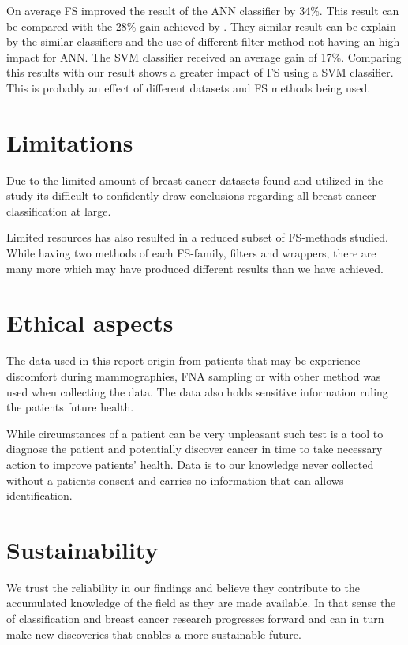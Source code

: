 On average FS improved the result of the ANN classifier by 34\%. This result can be compared with the 28\% gain achieved by \textcite{karabulut2012}. They similar result can be explain by the similar classifiers and the use of different filter method not having an high impact for ANN. The SVM classifier received an average gain of 17\%. Comparing this results with \textcite{b20103177} our result shows a greater impact of FS using a SVM classifier. This is probably an effect of different datasets and FS methods being used.

\section{Limitations}

Due to the limited amount of breast cancer datasets found and utilized in the study its difficult to confidently draw conclusions regarding all breast cancer classification at large.

Limited resources has also resulted in a reduced subset of FS-methods studied. While having two methods of each FS-family, filters and wrappers, there are many more which may have produced different results than we have achieved.


\section{Ethical aspects}

The data used in this report origin from patients that may be experience discomfort during mammographies, FNA sampling or with other method was used when collecting the data. The data also holds sensitive information ruling the patients future health.

While circumstances of a patient can be very unpleasant such test is a tool to diagnose the patient and potentially discover cancer in time to take necessary action to improve patients' health. Data is to our knowledge never collected without a patients consent and carries no information that can allows identification.

\section{Sustainability}

We trust the reliability in our findings and believe they contribute to the accumulated knowledge of the field as they are made available. In that sense the of classification and breast cancer research progresses forward and can in turn make new discoveries that enables a more sustainable future.
